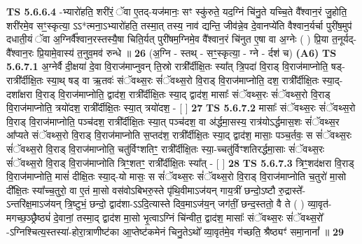 \documentclass[17pt]{extarticle}
\begin{document}
                  \newline
                                \textbf{ TS 5.6.6.4} \newline
                  -भ्यारो॑हति॒ शरी॑रं॒ ॅवा ए॒तद्-यज॑मानः॒ सꣳ स्कु॑रुते॒ यद॒ग्निं चि॑नु॒ते यच्चि॒ते वै᳚श्वान॒रं जु॒होति॒ शरी॑रमे॒व सꣳ॒॒स्कृत्या॒ ऽऽ*त्मना॒ऽभ्यारो॑हति॒ तस्मा॒त् तस्य॒ नाव॑ द्यन्ति॒ जीव॑न्ने॒व दे॒वानप्ये॑ति वैश्वान॒र्यर्चा पुरी॑ष॒मुप॑ दधाती॒यं ॅवा अ॒ग्निर्वै᳚श्वान॒रस्तस्यै॒षा चिति॒र्यत् पुरी॑षम॒ग्निमे॒व वै᳚श्वान॒रं चि॑नुत ए॒षा वा अ॒ग्नेः ( ) प्रि॒या त॒नूर्यद्-वै᳚श्वान॒रः प्रि॒यामे॒वास्य॑ त॒नुव॒मव॑ रुन्धे ॥ \textbf{  26} \newline
                  \newline
                      (अ॒ग्नि - स्तथ् - सꣳ॒॒स्कृत्या॒ - ग्ने - र्दश॑ च)  \textbf{(A6)} \newline \newline
                                        \textbf{ TS 5.6.7.1} \newline
                  अ॒ग्नेर्वै दी॒क्षया॑ दे॒वा वि॒राज॑माप्नुवन् ति॒स्रो रात्री᳚र्दीक्षि॒तः स्या᳚त् त्रि॒पदा॑ वि॒राड् वि॒राज॑माप्नोति॒ षड्-रात्री᳚र्दीक्षि॒तः स्या॒थ् षड् वा ऋ॒तवः॑ संॅवथ्स॒रः सं॑ॅवथ्स॒रो वि॒राड् वि॒राज॑माप्नोति॒ दश॒ रात्री᳚र्दीक्षि॒तः स्या॒द्-दशा᳚क्षरा वि॒राड् वि॒राज॑माप्नोति॒ द्वाद॑श॒ रात्री᳚र्दीक्षि॒तः स्या॒द् द्वाद॑श॒ मासाः᳚ संॅवथ्स॒रः सं॑ॅवथ्स॒रो वि॒राड् वि॒राज॑माप्नोति॒ त्रयो॑दश॒ रात्री᳚र्दीक्षि॒तः स्या॒त् त्रयो॑दश॒ - [  ] \textbf{  27} \newline
                  \newline
                                \textbf{ TS 5.6.7.2} \newline
                  मासाः᳚ संॅवथ्स॒रः सं॑ॅवथ्स॒रो वि॒राड् वि॒राज॑माप्नोति॒ पञ्च॑दश॒ रात्री᳚र्दीक्षि॒तः स्या॒त् पञ्च॑दश॒ वा अ॑र्द्धमा॒सस्य॒ रात्र॑योऽर्द्धमास॒शः सं॑ॅवथ्स॒र आ᳚प्यते संॅवथ्स॒रो वि॒राड् वि॒राज॑माप्नोति स॒प्तद॑श॒ रात्री᳚र्दीक्षि॒तः स्या॒द् द्वाद॑श॒ मासाः॒ पञ्च॒र्तवः॒ स सं॑ॅवथ्स॒रः सं॑ॅवथ्स॒रो वि॒राड् वि॒राज॑माप्नोति॒ चतु॑र्विꣳशतिꣳ॒॒ रात्री᳚र्दीक्षि॒तः स्या॒-च्चतु॑र्विꣳशतिरर्द्धमा॒साः सं॑ॅवथ्स॒रः सं॑ॅवथ्स॒रो वि॒राड् वि॒राज॑माप्नोति त्रिꣳ॒॒शतꣳ॒॒ रात्री᳚र्दीक्षि॒तः स्या᳚त् - [  ] \textbf{  28} \newline
                  \newline
                                \textbf{ TS 5.6.7.3} \newline
                  त्रिꣳ॒॒शद॑क्षरा वि॒राड् वि॒राज॑माप्नोति॒ मासं॑ दीक्षि॒तः स्या॒द्-यो मासः॒ स सं॑ॅवथ्स॒रः सं॑ॅवथ्स॒रो वि॒राड् वि॒राज॑माप्नोति च॒तुरो॑ मा॒सो दी᳚क्षि॒तः स्या᳚च्च॒तुरो॒ वा ए॒तं मा॒सो वस॑वोऽबिभरु॒स्ते पृ॑थि॒वीमाऽज॑यन् गाय॒त्रीं छन्दो॒ऽष्टौ रु॒द्रास्ते᳚-ऽन्तरि॑क्ष॒माऽज॑यन् त्रि॒ष्टुभं॒ छन्दो॒ द्वाद॑शा-ऽऽदि॒त्यास्ते दिव॒माऽज॑य॒न् जग॑तीं॒ छन्द॒स्ततो॒ वै ते ( ) व्या॒वृत॑-मगच्छ॒ञ्छ्रैष्ठ्यं॑ दे॒वानां॒ तस्मा॒द् द्वाद॑श मा॒सो भृ॒त्वाऽग्निं चि॑न्वीत॒ द्वाद॑श॒ मासाः᳚ संॅवथ्स॒रः सं॑ॅवथ्स॒रो᳚ -ऽग्निश्चित्य॒स्तस्या॑-होरा॒त्राणीष्ट॑का आ॒प्तेष्ट॑कमेनं चिनु॒तेऽथो᳚ व्या॒वृत॑मे॒व ग॑च्छति॒ श्रैष्ठ्यꣳ॑ समा॒नानां᳚ ॥ \textbf{  29 } \newline
\end{document}
